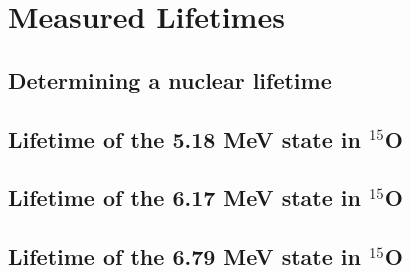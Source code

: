 %
%
%
%
%
%
%
%
%
%


%
%


\chapter{Measured Lifetimes}
\label{chap: lifetime}

\section{Determining a nuclear lifetime}
\label{sec: lifetime simulation}


\section{Lifetime of the 5.18 MeV state in $^{15}$O}
\label{sec: lifetime518}


\section{Lifetime of the 6.17 MeV state in $^{15}$O}
\label{sec: lifetime617}


\section{Lifetime of the 6.79 MeV state in $^{15}$O}
\label{sec: lifetime679}

%
% 
% 

